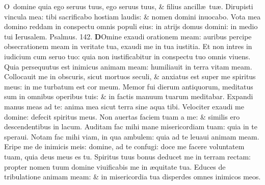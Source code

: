 \documentclass[a5paper,10pt]{book}
\def\ae{æ}
\begin{document}
\begin{multicols*}{2}
\newline \color{red} O\color{black}\ domine quia ego seruus tuus, ego seruus tuus, \& filius ancill\ae \ tu\ae .
\newline \color{red} D\color{black}irupisti vincula mea: tibi sacrificabo hostiam laudis: \& nomen domini inuocabo.
\newline \color{red} V\color{black}ota mea domino reddam in conspectu omnis populi eius: in atrijs domus domini: in medio tui Ierusalem.
\newline \color{red} Psalmus. 142. \color{black}
\vspace{-1em}
\lettrine[lines=2]{\bfseries \color{red} D}{}Omine exaudi orationem meam: auribus percipe obsecrationem meam in veritate tua, exaudi me in tua iustitia.
\newline \color{red} E\color{black}t non intres in iudicium cum seruo tuo: quia non iustificabitur in conspectu tuo omnis viuens.
\newline \color{red} Q\color{black}uia persequutus est inimicus animam meam: humiliauit in terra vitam meam.
\newline \color{red} C\color{black}ollocauit me in obscuris, sicut mortuos seculi, \& anxiatus est super me spiritus meus: in me turbatum est cor meum.
\newline \color{red} M\color{black}emor fui dierum antiquorum, meditatus sum in omnibus operibus tuis: \& in factis manuum tuarum meditabar.
\newline \color{red} E\color{black}xpandi manus meas ad te: anima mea sicut terra sine aqua tibi.
\newline \color{red} V\color{black}elociter exaudi me domine: defecit spiritus meus.
\newline \color{red} N\color{black}on auertas faciem tuam a me: \& similis ero descendentibus in lacum.
\newline \color{red} A\color{black}uditam fac mihi mane misericordiam tuam: quia in te speraui.
\newline \color{red} N\color{black}otam fac mihi viam, in qua ambulem: quia ad te leuaui animam meam.
\newline \color{red} E\color{black}ripe me de inimicis meis: domine, ad te confugi: doce me facere voluntatem tuam, quia deus meus es tu.
\newline \color{red} S\color{black}piritus tuus bonus deducet me in terram rectam: propter nomen tuum domine viuificabis me in \ae quitate tua.
\newline \color{red} E\color{black}duces de tribulatione animam meam: \& in misericordia tua disperdes omnes inimicos meos.%

\end{multicols*}
\end{document}
